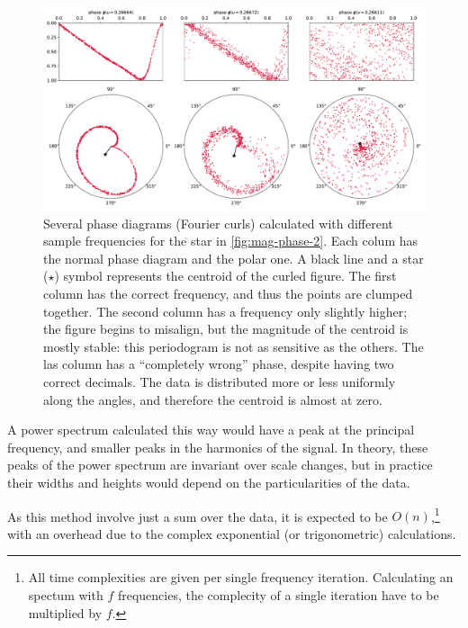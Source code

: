 	\begin{figure}
		\centering
		\includegraphics[width=\textwidth]{img/complex_phase_off.pdf}
		\caption[Off-frequency phase diagrams: real and complex]{
			Several phase diagrams (Fourier curls) calculated with different sample frequencies for the star in \autoref{fig:mag-phase-2}.
			Each colum has the normal phase diagram and the polar one. A black line and a star ($\star$) symbol represents the centroid of the curled figure.
			The first column has the correct frequency, and thus the points are clumped together.
			The second column has a frequency only slightly higher; the figure begins to misalign, 
			but the magnitude of the centroid is mostly stable: this periodogram is not as sensitive as the others.
			The las column has a \enquote{completely wrong} phase, despite having two correct decimals.
			The data is distributed more or less uniformly along the angles, and therefore the centroid is almost at zero.
		}
		\label{fig:complex-phase-off}
	\end{figure}
	
	A power spectrum calculated this way would have a peak at the principal frequency, and smaller peaks in the harmonics of the signal.
	In theory, these peaks of the power spectrum are invariant over scale changes, 
	but in practice their widths and heights would depend on the particularities of the data.
	
	As this method involve just a sum over the data, it is expected to be $O(n)$,\footnote{
		All time complexities are given per single frequency iteration. 
		Calculating an spectum with $f$ frequencies, the complecity of a single iteration have to be multiplied by $f$.
	} 
	with an overhead due to the complex exponential (or trigonometric) calculations.
	
